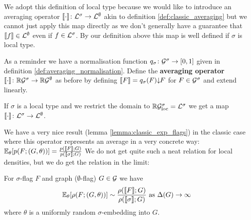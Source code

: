 We adopt this definition of local type because we would like to introduce an averaging
operator $\llbracket \cdot \rrbracket \colon \mathcal{L}^\sigma \to \mathcal{L}^\emptyset$ akin
to definition \ref{def:classic_averaging} but we cannot just apply this map directly
as we don't generally have a guarantee that $\llbracket f \rrbracket \in \mathcal{L}^\emptyset$ even
if $f\in\mathcal{L}^\sigma$. By our definition above this map is well
defined if $\sigma$ is local type.

\begin{definition}
    As a reminder we have a normalisation function $q_\sigma\colon\mathcal{G}^\sigma\to[0, 1]$
    given in definition \ref{def:averaging_normalisation}.
    Define the \textbf{averaging operator}
    $\llbracket \cdot \rrbracket\colon \mathbb{R}\mathcal{G}^\sigma \to \mathbb{R}\mathcal{G}^\emptyset$
    as before by defining
    $\llbracket F \rrbracket = q_\sigma(F){\downarrow\!\!F}$ for $F\in\mathcal{G}^\sigma$ and
    extend linearly.

    If $\sigma$ is a local type and we restrict the domain to $\mathbb{R}\mathcal{G}_\mathrm{loc}^\sigma = \mathcal{L}^\sigma$
    we get a map
    $\llbracket \cdot\rrbracket\colon \mathcal{L}^\sigma \to \mathcal{L}^\emptyset$.
\end{definition}

We have a very nice result (lemma \ref{lemma:classic_exp_flags}) in the classic case where this
operator represents an average in a very concrete way:
$\mathbb{E}_\theta[p(F; (G,\theta))] = \frac{p(\llbracket F \rrbracket; G)}{p(\llbracket\sigma\rrbracket;
G)}$
We do not get quite such a neat relation for local densities, but we do get the relation
in the limit:

\begin{lemma}
    \label{lemma:local_averaging_exp}
    For $\sigma$-flag $F$ and graph ($\emptyset$-flag) $G\in\mathcal{G}$ we have
    \[
        \mathbb{E}_\theta[\rho(F; (G,\theta))] \sim
        \frac{\rho(\llbracket F\rrbracket; G)}{\rho(\llbracket \sigma\rrbracket; G)}
        \ \text{as}\ \Delta(G) \to \infty
    \]
    where $\theta$ is a uniformly random $\sigma$-embedding into $G$.
\end{lemma}

